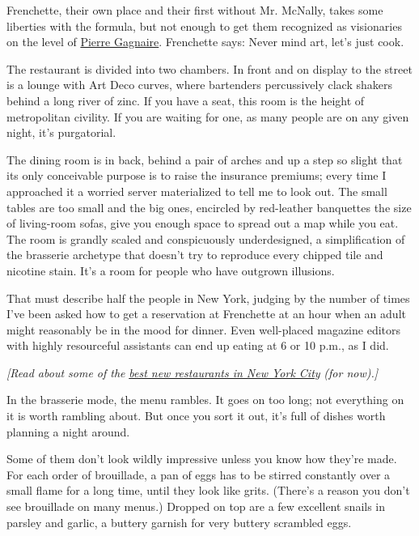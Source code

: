 Frenchette, their own place and their first without Mr. McNally, takes
some liberties with the formula, but not enough to get them recognized
as visionaries on the level of
\href{http://www.pierre-gagnaire.com/}{Pierre Gagnaire}. Frenchette
says: Never mind art, let's just cook.

The restaurant is divided into two chambers. In front and on display to
the street is a lounge with Art Deco curves, where bartenders
percussively clack shakers behind a long river of zinc. If you have a
seat, this room is the height of metropolitan civility. If you are
waiting for one, as many people are on any given night, it's
purgatorial.

The dining room is in back, behind a pair of arches and up a step so
slight that its only conceivable purpose is to raise the insurance
premiums; every time I approached it a worried server materialized to
tell me to look out. The small tables are too small and the big ones,
encircled by red-leather banquettes the size of living-room sofas, give
you enough space to spread out a map while you eat. The room is grandly
scaled and conspicuously underdesigned, a simplification of the
brasserie archetype that doesn't try to reproduce every chipped tile and
nicotine stain. It's a room for people who have outgrown illusions.

That must describe half the people in New York, judging by the number of
times I've been asked how to get a reservation at Frenchette at an hour
when an adult might reasonably be in the mood for dinner. Even
well-placed magazine editors with highly resourceful assistants can end
up eating at 6 or 10 p.m., as I did.

\emph{{[}Read about some of the}
\href{https://www.nytimes3xbfgragh.onion/2018/11/15/nyregion/best-new-nyc-restaurants.html?action=click\&module=Intentional\&pgtype=Article}{\emph{best
new restaurants in New York City}} \emph{(for now).{]}}

In the brasserie mode, the menu rambles. It goes on too long; not
everything on it is worth rambling about. But once you sort it out, it's
full of dishes worth planning a night around.

Some of them don't look wildly impressive unless you know how they're
made. For each order of brouillade, a pan of eggs has to be stirred
constantly over a small flame for a long time, until they look like
grits. (There's a reason you don't see brouillade on many menus.)
Dropped on top are a few excellent snails in parsley and garlic, a
buttery garnish for very buttery scrambled eggs.

